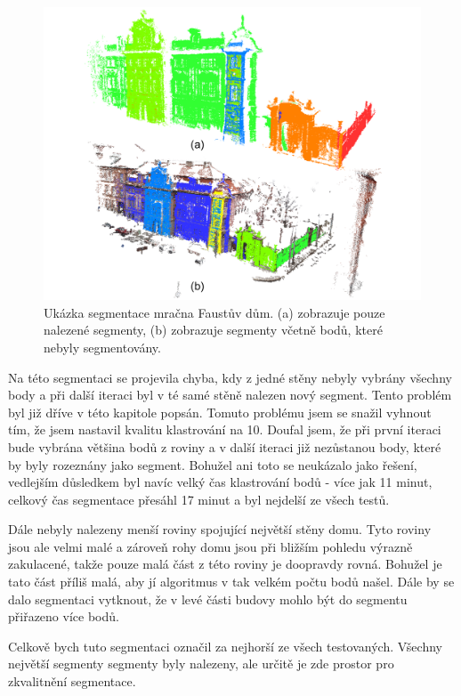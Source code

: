 \documentclass[11pt,twoside,a4paper]{book}
\begin{document}
\begin{figure}[ht]
\begin{center}
\includegraphics[width=\textwidth]{figures/test-fa}
\caption{Ukázka segmentace mračna Faustův dům. (a) zobrazuje pouze nalezené segmenty, (b) zobrazuje segmenty včetně bodů, které nebyly segmentovány.}
\label{fig:test-fa}
\end{center}
\end{figure}

Na této segmentaci se projevila chyba, kdy z jedné stěny nebyly vybrány všechny body a při další iteraci byl v té samé stěně nalezen nový segment. Tento problém byl již dříve v této kapitole popsán. Tomuto problému jsem se snažil vyhnout tím, že jsem nastavil kvalitu klastrování na 10. Doufal jsem, že při první iteraci bude vybrána většina bodů z roviny a v další iteraci již nezůstanou body, které by byly rozeznány jako segment. Bohužel ani toto se neukázalo jako řešení, vedlejším důsledkem byl navíc velký čas klastrování bodů - více jak 11 minut, celkový čas segmentace přesáhl 17 minut a byl nejdelší ze všech testů.

Dále nebyly nalezeny menší roviny spojující největší stěny domu. Tyto roviny jsou ale velmi malé a zároveň rohy domu jsou při bližším pohledu výrazně zakulacené, takže pouze malá část z této roviny je doopravdy rovná. Bohužel je tato část příliš malá, aby jí algoritmus v tak velkém počtu bodů našel. Dále by se dalo segmentaci vytknout, že v levé části budovy mohlo být do segmentu přiřazeno více bodů.

Celkově bych tuto segmentaci označil za nejhorší ze všech testovaných. Všechny největší segmenty segmenty byly nalezeny, ale určitě je zde prostor pro zkvalitnění segmentace. 
\end{document}
